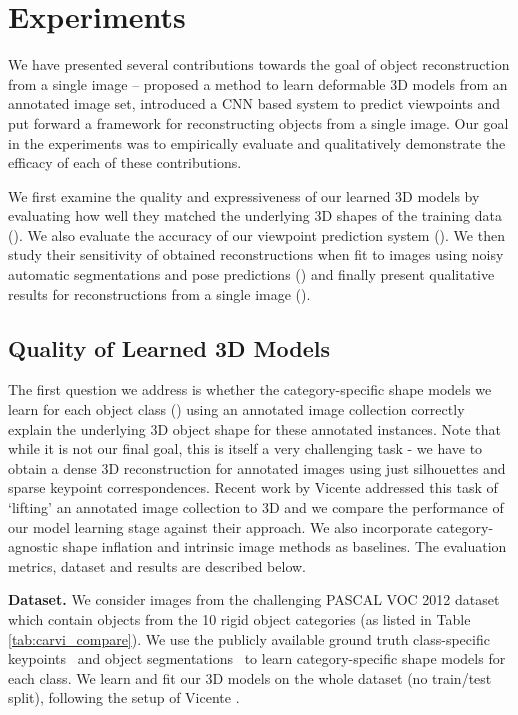 
\section{Experiments}

We have presented several contributions towards the goal of object reconstruction from a single image --  proposed a method to learn deformable 3D models from an annotated image set,  introduced a CNN based system to predict viewpoints and  put forward a framework for reconstructing objects from a single image. Our goal in the experiments was to empirically evaluate and qualitatively demonstrate the efficacy of each of these contributions.

We first  examine the quality and expressiveness of our learned 3D models by evaluating how well they matched the underlying 3D shapes of the training data (). We also evaluate the accuracy of our viewpoint prediction system (). We then study their sensitivity of obtained reconstructions when fit to images using noisy automatic segmentations and pose predictions () and finally present qualitative results for reconstructions from a single image ().


\subsection{Quality of Learned 3D Models}
The first question we address is whether the category-specific shape models we learn for each object class () using an annotated image collection correctly explain the underlying 3D object shape for these annotated instances. Note that while it is not our final goal, this is itself a very challenging task - we have to obtain a dense 3D reconstruction for annotated images using just silhouettes and sparse keypoint correspondences. Recent work by Vicente \etal \cite{carvi14} addressed this task of `lifting' an annotated image collection to 3D and we compare the performance of our model learning stage against their approach. We also incorporate category-agnostic shape inflation  \cite{twarog2012playing} and intrinsic image \cite{Barron2012B} methods as baselines. The evaluation metrics, dataset and results are described below.

\vspace{3mm}
\noindent \textbf{Dataset.} We consider images from the challenging PASCAL VOC 2012 dataset~\cite{pascal-voc-2012} which contain objects from the 10 rigid object categories (as listed in Table \ref{tab:carvi_compare}). We use the publicly available ground truth class-specific keypoints~\cite{bourdevECCV10} and object segmentations~\cite{BharathICCV2011} to learn category-specific shape models for each class. We learn and fit our 3D models on the whole dataset (no train/test split), following the setup of Vicente \etal \cite{carvi14}.

